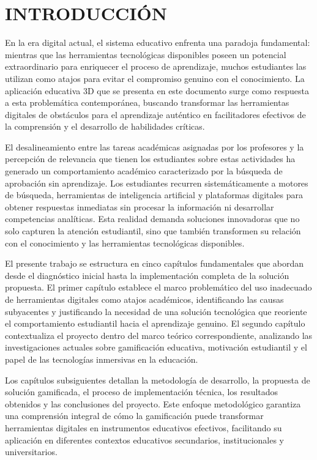 \section{INTRODUCCIÓN}

En la era digital actual, el sistema educativo enfrenta una paradoja fundamental: mientras que las herramientas tecnológicas disponibles poseen un potencial extraordinario para enriquecer el proceso de aprendizaje, muchos estudiantes las utilizan como atajos para evitar el compromiso genuino con el conocimiento. La aplicación educativa 3D que se presenta en este documento surge como respuesta a esta problemática contemporánea, buscando transformar las herramientas digitales de obstáculos para el aprendizaje auténtico en facilitadores efectivos de la comprensión y el desarrollo de habilidades críticas.

El desalineamiento entre las tareas académicas asignadas por los profesores y la percepción de relevancia que tienen los estudiantes sobre estas actividades ha generado un comportamiento académico caracterizado por la búsqueda de aprobación sin aprendizaje. Los estudiantes recurren sistemáticamente a motores de búsqueda, herramientas de inteligencia artificial y plataformas digitales para obtener respuestas inmediatas sin procesar la información ni desarrollar competencias analíticas. Esta realidad demanda soluciones innovadoras que no solo capturen la atención estudiantil, sino que también transformen su relación con el conocimiento y las herramientas tecnológicas disponibles.

El presente trabajo se estructura en cinco capítulos fundamentales que abordan desde el diagnóstico inicial hasta la implementación completa de la solución propuesta. El primer capítulo establece el marco problemático del uso inadecuado de herramientas digitales como atajos académicos, identificando las causas subyacentes y justificando la necesidad de una solución tecnológica que reoriente el comportamiento estudiantil hacia el aprendizaje genuino. El segundo capítulo contextualiza el proyecto dentro del marco teórico correspondiente, analizando las investigaciones actuales sobre gamificación educativa, motivación estudiantil y el papel de las tecnologías inmersivas en la educación.

Los capítulos subsiguientes detallan la metodología de desarrollo, la propuesta de solución gamificada, el proceso de implementación técnica, los resultados obtenidos y las conclusiones del proyecto. Este enfoque metodológico garantiza una comprensión integral de cómo la gamificación puede transformar herramientas digitales en instrumentos educativos efectivos, facilitando su aplicación en diferentes contextos educativos secundarios, institucionales y universitarios.

